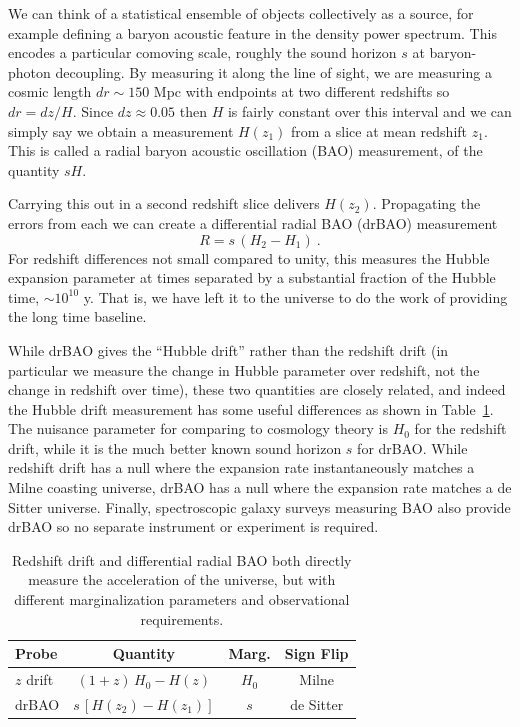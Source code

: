 \documentclass[preprint2, 10pt]{aastex}
\newcommand{\be}{\begin{equation}}
\newcommand{\ee}{\end{equation}}
\begin{document}
{We can think of a statistical ensemble of objects collectively as 
a source, for example 
defining a baryon acoustic feature in the density power spectrum.  This 
encodes a particular comoving scale, roughly the sound horizon $s$ at 
baryon-photon decoupling.  By measuring it along the line of sight, we 
are measuring a cosmic length $dr\sim150$ Mpc with endpoints at two 
different redshifts so $dr=dz/H$.  Since $dz\approx0.05$ then $H$ is 
fairly constant over this interval and we can simply say we obtain a 
measurement $H(z_1)$ from a slice at mean redshift $z_1$.  This is called a 
radial baryon acoustic oscillation (BAO) measurement, of the quantity 
$sH$. 

Carrying this out in a second redshift slice delivers $H(z_2)$.  Propagating 
the errors from each we can create a differential radial BAO (drBAO) 
measurement 
\be 
R=s\,(H_2-H_1) \ . \label{eq:drbao} 
\ee 
For redshift differences not small compared to unity, this measures the 
Hubble expansion parameter at times separated by a substantial fraction 
of the Hubble time, $\sim10^{10}$ y.  That is, we have left it to the universe 
to do the work of providing the long time baseline.  

While drBAO gives the ``Hubble drift'' rather than the redshift drift 
(in particular we measure the change in Hubble parameter over redshift, 
not the change in redshift over time), these two quantities are 
closely related, and indeed the Hubble drift measurement has some 
useful differences as shown in Table~\ref{tab:drbao}.  The nuisance 
parameter for comparing to cosmology theory is $H_0$ for the redshift 
drift, while it is the much better known sound horizon $s$ for drBAO.  
While redshift drift has a null where the expansion rate instantaneously 
matches a Milne coasting universe, 
drBAO has a null where the expansion rate matches a 
de Sitter universe. Finally, 
spectroscopic galaxy surveys measuring BAO also provide drBAO so no 
separate instrument or experiment is required. 


\begin{table}[!htb]
\small 
\begin{tabular}{l|ccc} 
Probe  &  Quantity  & Marg. & Sign Flip\\ 
\hline 
$z$ drift &$(1+z)\,H_0-H(z)$ & $H_0$ & Milne \\ 
drBAO & $s\,[H(z_2)-H(z_1)]$ & $s$ & de Sitter \\ 
\end{tabular} 
\caption{Redshift drift and differential radial BAO both 
directly measure the acceleration of the universe, but with different 
marginalization parameters and observational requirements. 
} 
\label{tab:drbao} 
\end{table} 
}
\end{document}
